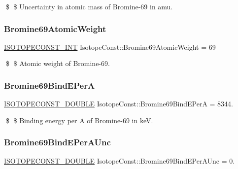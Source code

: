 \$ \$ Uncertainty in atomic mass of Bromine-\/69 in amu. \mbox{\label{group___isotope_const-_bromine-_br69_gad3a682360bc514a4c93d0c40323c1738}} 
\subsubsection{\texorpdfstring{Bromine69\+Atomic\+Weight}{Bromine69AtomicWeight}}
{\footnotesize\ttfamily \mbox{\hyperlink{group___isotope_const-_macros_ga5f18360b3e99483a35c32d789e62621c}{I\+S\+O\+T\+O\+P\+E\+C\+O\+N\+S\+T\+\_\+\+I\+NT}} Isotope\+Const\+::\+Bromine69\+Atomic\+Weight = 69}

\$ \$ Atomic weight of Bromine-\/69. \mbox{\label{group___isotope_const-_bromine-_br69_gaa401e2348880fcd368e2e4e1db254901}} 
\subsubsection{\texorpdfstring{Bromine69\+Bind\+E\+PerA}{Bromine69BindEPerA}}
{\footnotesize\ttfamily \mbox{\hyperlink{group___isotope_const-_macros_ga8f45a7272ce02c0b4c65c44636ed719a}{I\+S\+O\+T\+O\+P\+E\+C\+O\+N\+S\+T\+\_\+\+D\+O\+U\+B\+LE}} Isotope\+Const\+::\+Bromine69\+Bind\+E\+PerA = 8344.}

\$ \$ Binding energy per A of Bromine-\/69 in keV. \mbox{\label{group___isotope_const-_bromine-_br69_ga5c2c42cfcd140446e30a69b82c9c69d5}} 
\subsubsection{\texorpdfstring{Bromine69\+Bind\+E\+Per\+A\+Unc}{Bromine69BindEPerAUnc}}
{\footnotesize\ttfamily \mbox{\hyperlink{group___isotope_const-_macros_ga8f45a7272ce02c0b4c65c44636ed719a}{I\+S\+O\+T\+O\+P\+E\+C\+O\+N\+S\+T\+\_\+\+D\+O\+U\+B\+LE}} Isotope\+Const\+::\+Bromine69\+Bind\+E\+Per\+A\+Unc = 0.}

